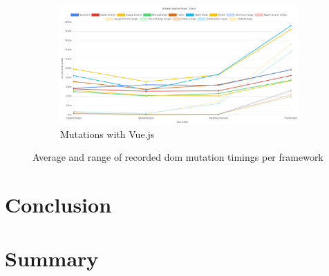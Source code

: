 \documentclass[a4paper, 10pt]{article}
\makeatletter
\renewcommand\lstlistoflistings{
  \section{\lstlistlistingname}
  \@starttoc{lol}%
}
\makeatother
\begin{document}
\begin{figure}[ht!]\ContinuedFloat
  \begin{subfigure}{0.9\linewidth}
    \begin{center}
      \includegraphics[width=\linewidth, keepaspectratio]{img/playwright-results/framework/VueAvg.png}
    \end{center}
    \caption{Mutations with Vue.js}\label{subfig:PW:VueAvg}
  \end{subfigure}
  \caption{Average and range of recorded \acrshort{dom} mutation timings per framework}
  \label{fig:playwrightResults:frameworks:Avg}
\end{figure}

\section{Conclusion}\label{sec:conclusion}

\section{Summary}\label{sec:summary}

\pagebreak

\appendix

\lstlistoflistings
\end{document}

